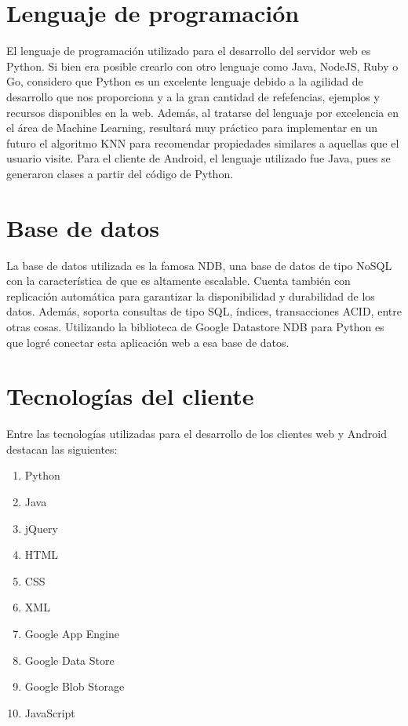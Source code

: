 \documentclass[12pt]{article}
\begin{document}
\section{Lenguaje de programación}

El lenguaje de programación utilizado para el desarrollo del servidor web es Python. Si bien era posible crearlo con otro lenguaje como Java, NodeJS, Ruby o Go, considero que Python es un excelente lenguaje debido a la agilidad de desarrollo que nos proporciona y a la gran cantidad de refefencias, ejemplos y recursos disponibles en la web. Además, al tratarse del lenguaje por excelencia en el área de Machine Learning, resultará muy práctico para implementar en un futuro el algoritmo KNN para recomendar propiedades similares a aquellas que el usuario visite. Para el cliente de Android, el lenguaje utilizado fue Java, pues se generaron clases a partir del código de Python.

\section{Base de datos}

La base de datos utilizada es la famosa NDB, una base de datos de tipo NoSQL con la característica de que es altamente escalable. Cuenta también con replicación automática para garantizar la disponibilidad y durabilidad de los datos. Además, soporta consultas de tipo SQL, índices, transacciones ACID, entre otras cosas. Utilizando la biblioteca de Google Datastore NDB para Python es que logré conectar esta aplicación web a esa base de datos.

\section{Tecnologías del cliente}

Entre las tecnologías utilizadas para el desarrollo de los clientes web y Android destacan las siguientes:

\begin{enumerate}
\item Python
\item Java
\item jQuery
\item HTML
\item CSS
\item XML
\item Google App Engine
\item Google Data Store
\item Google Blob Storage
\item JavaScript
\end{enumerate}
\end{document}
